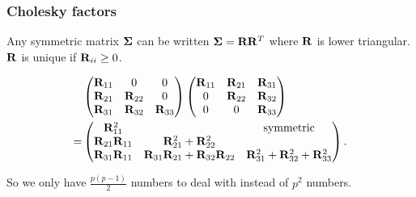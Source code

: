\documentclass{beamer}
\begin{document}
\begin{frame}
	\frametitle{Cholesky factors}
	Any symmetric matrix ${\boldsymbol \Sigma}$ can be written ${\boldsymbol \Sigma} = {\bf R} {\bf R}^T$
	where ${\bf R}$ is lower triangular. ${\bf R}$ is unique if ${\bf R}_{ii} \geq 0$.
	
	\begin{align*}
		&\begin{pmatrix}
		{\bf R}_{11}          & 0                                    & 0                                     \\
		{\bf R}_{21}          & {\bf R}_{22}                             & 0                                     \\
		{\bf R}_{31}          & {\bf R}_{32}                             & {\bf R}_{33}                              
		\end{pmatrix}
		\begin{pmatrix}
		{\bf R}_{11}          & {\bf R}_{21}                             & {\bf R}_{31}                              \\
		0                 & {\bf R}_{22}                             & {\bf R}_{32}                              \\
		0                 & 0                                    & {\bf R}_{33}                              
		\end{pmatrix}
		\\
		=& \begin{pmatrix}
		{\bf R}_{11}^2        &                                      & \text{symmetric}                      \\
		{\bf R}_{21}{\bf R}_{11} & {\bf R}_{21}^2 + {\bf R}_{22}^2 \\
		{\bf R}_{31} {\bf R}_{11} & {\bf R}_{31}{\bf R}_{21} + {\bf R}_{32} {\bf R}_{22} & {\bf R}_{31}^2 + {\bf R}_{32} ^2 + {\bf R}_{33}^2 
		\end{pmatrix}.
	\end{align*}
	
	So we only have $\frac{p(p-1)}{2}$ numbers to deal with instead of
	$p^2$ numbers.
	
\end{frame}
\end{document}
